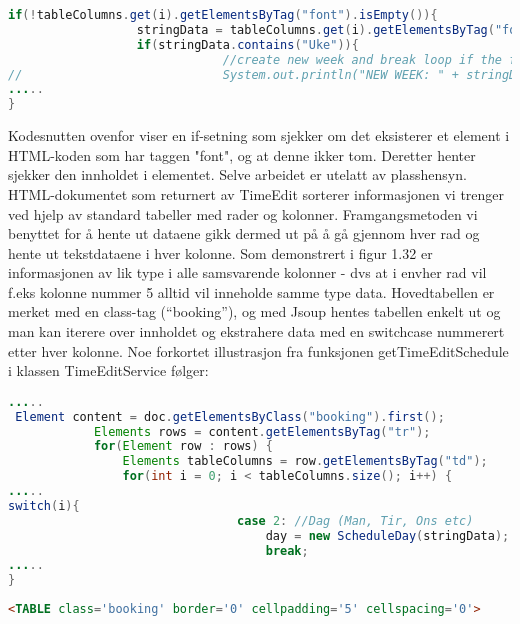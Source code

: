 \documentclass[../main.tex]{subfiles}
\begin{document}
\begin{lstlisting}[language=Java, frame=single, caption={Utdrag fra klassen TimeEditService i web-applikasjonen}]
if(!tableColumns.get(i).getElementsByTag("font").isEmpty()){
                  stringData = tableColumns.get(i).getElementsByTag("font").first().text();
                  if(stringData.contains("Uke")){
                              //create new week and break loop if the first element contains Uke
//                            System.out.println("NEW WEEK: " + stringData);
.....
}
\end{lstlisting}

Kodesnutten ovenfor viser en if-setning som sjekker om det eksisterer et element i HTML-koden som har taggen "font", og at denne ikker tom. Deretter henter sjekker den innholdet i elementet. Selve arbeidet er utelatt av plasshensyn.\newline
HTML-dokumentet som returnert av TimeEdit sorterer informasjonen vi trenger ved hjelp av standard tabeller med rader og kolonner. Framgangsmetoden vi benyttet for å hente ut dataene gikk dermed ut på å gå gjennom hver rad og hente ut tekstdataene i hver kolonne. Som demonstrert i figur 1.32 er informasjonen av lik type i alle samsvarende kolonner - dvs at i envher rad vil f.eks kolonne nummer 5 alltid vil inneholde samme type data.\newline
Hovedtabellen er merket med en class-tag (“booking”), og med Jsoup hentes tabellen enkelt ut og man kan iterere over innholdet og ekstrahere data med en switchcase nummerert etter hver kolonne. Noe forkortet illustrasjon fra funksjonen getTimeEditSchedule i klassen TimeEditService følger:

\begin{lstlisting}[language=Java, frame=single, caption={Utdrag fra klassen TimeEditService fra no.hials.muldvarpweb.v2}]
.....
 Element content = doc.getElementsByClass("booking").first();
            Elements rows = content.getElementsByTag("tr");
            for(Element row : rows) {
                Elements tableColumns = row.getElementsByTag("td");
                for(int i = 0; i < tableColumns.size(); i++) {
.....
switch(i){
                                case 2: //Dag (Man, Tir, Ons etc)
                                    day = new ScheduleDay(stringData);
                                    break;
.....
}
\end{lstlisting}

\begin{lstlisting}[language=HTML, frame=single, caption={Utdrag fra HTML-kildekoden til nettsiden i figur \ref{fig:timeeditc}}]
<TABLE class='booking' border='0' cellpadding='5' cellspacing='0'>
\end{lstlisting}
\end{document}
